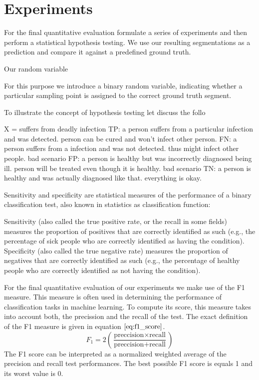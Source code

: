 \chapter{Experiments}

For the final quantitative evaluation formulate a series of experiments and then perform a statistical hypothesis testing. 
We use our resulting segmentations as a prediction and compare it against a predefined ground truth. 


Our random variable 

For this purpose we introduce a binary random variable, indicating whether a particular sampling point is assigned to the correct ground truth segment.

To illustrate the concept of hypothesis testing let discuss the follo


X = suffers from deadly infection
TP: a person suffers from a particular infection and was detected. person can be cured and won't infect other person.
FN: a person suffers from a infection and was not detected. thus might infect other people. bad scenario
FP: a person is healthy but was incorrectly diagnosed being ill. person will be treated even though it is healthy. bad scenario
TN: a person is healthy and was actually diagnosed like that. everything is okay.


Sensitivity and specificity are statistical measures of the performance of a binary classification test, also known in statistics as classification function:

  Sensitivity (also called the true positive rate, or the recall in some fields) measures the proportion of positives that are correctly identified as such (e.g., the percentage of sick people who are correctly identified as having the condition).
    Specificity (also called the true negative rate) measures the proportion of negatives that are correctly identified as such (e.g., the percentage of healthy people who are correctly identified as not having the condition).


    
For the final quantitative evaluation of our experiments we make use of the F1 measure. This measure is often used in determining the performance of  classification tasks in machine learning. To compute its score, this measure takes into account both, the precission and the recall of the test. 
 The exact definition of the F1 measure is given in equation $\ref{eq:f1_score}$.
\begin{equation}
F_1 = 2 \left( \frac{\text{preccision} \times \text{recall}}{\text{preccision} +\text{recall}} \right)
\label{eq:f1_score}
\end{equation}  
The F1 score can be interpreted as a normalized weighted average of the precision and recall test performances. The best possible F1 score is equals 1 and its worst value is 0.
    
